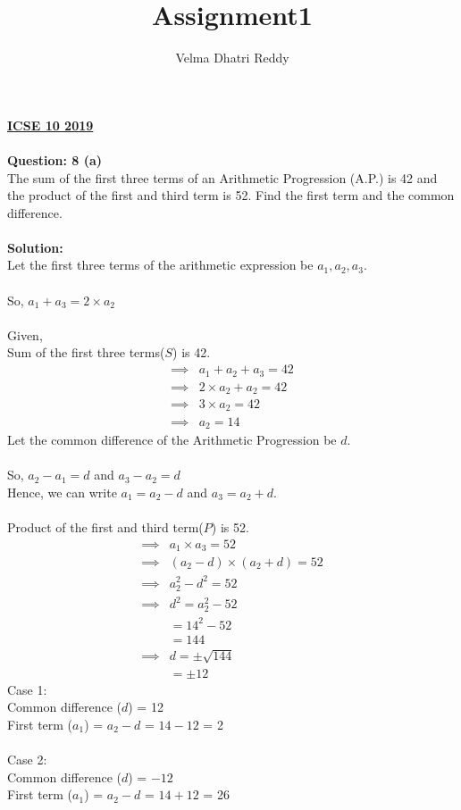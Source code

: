 \documentclass[journal,12pt,twocolumn]{IEEEtran}
\title{Assignment1}
\author{Velma Dhatri Reddy}
\begin{document}
\maketitle
\textbf{\underline{ICSE 10 2019}}\\\\
\textbf{Question: 8 (a)}\\
The sum of the first three terms of an Arithmetic Progression (A.P.) is 42 and the product of the first and third term is 52. Find the first term and the common difference.\\\\
\textbf{Solution: }\\
Let the first three terms of the arithmetic expression be $a_1, a_2, a_3$.\\\\
So, $a_1 + a_3 = 2\times a_2$\\\\
Given,\\
Sum of the first three terms($S$) is 42.
\begin{align}
    \implies
    &a_1 + a_2 + a_3 = 42\\
    \implies
    &2 \times a_2 + a_2 = 42\\
    \implies
    & 3\times a_2 = 42\\
    \implies
    &a_2 = 14
\end{align}
Let the common difference of the Arithmetic Progression be $d$.\\\\
So, $a_2 - a_1 = d$ and $a_3 - a_2 = d$\\
Hence, we can write $ a_1 = a_2 - d$ and $ a_3 = a_2 + d$.\\\\
Product of the first and third term($P$) is 52.
\begin{align}
    \implies
    &a_1 \times a_3 = 52\\
    \implies 
    &(a_2 - d) \times (a_2 + d) = 52\\
    \implies
    &a_2^2 - d^2 = 52\\
    \implies
    &d^2 = a_2^2 - 52\\
    &= 14^2 - 52\\
    &= 144\\
    \implies
    &d = \pm \sqrt{144}\\
    &= \pm 12
\end{align}
Case 1:\\
Common difference ($d$) = 12\\
First term ($a_1$) = $a_2 - d$ = $14 - 12$ = 2\\\\
Case 2:\\
Common difference ($d$) = $-12$\\
First term ($a_1$) = $a_2 - d$ = $14 + 12$ = 26\\
\end{document}
